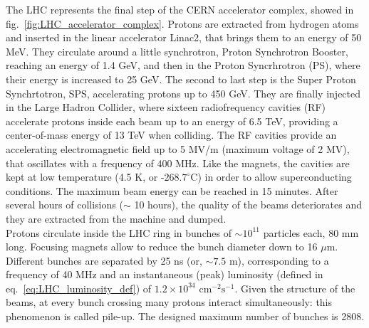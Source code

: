 \noindent The LHC represents the final step of the CERN accelerator complex, showed in fig.~\ref{fig:LHC_accelerator_complex}. Protons are extracted from hydrogen atoms and inserted in the linear accelerator Linac2, that brings them to an energy of 50 MeV. They circulate around a little synchrotron, Proton Synchrotron Booster, reaching an energy of 1.4 GeV, and then in the Proton Syncrhrotron (PS), where their energy is increased to 25 GeV. The second to last step is the Super Proton Synchrtotron, SPS, accelerating protons up to 450 GeV. They are finally injected in the Large Hadron Collider, where sixteen radiofrequency cavities (RF) accelerate protons inside each beam up to an energy of 6.5 TeV, providing a center-of-mass energy of 13 TeV when colliding. The RF cavities provide an accelerating electromagnetic field up to 5 MV/m (maximum voltage of 2 MV), that oscillates with a frequency of 400 MHz. Like the magnets, the cavities are kept at low temperature (4.5 K, or -$268.7^{\circ}$C) in order to allow superconducting conditions. The maximum beam energy can be reached in 15 minutes. After several hours of collisions ($\sim$ 10 hours), the quality of the beams deteriorates and they are extracted from the machine and dumped.\\

\noindent Protons circulate inside the LHC ring in bunches of $\sim10^{11}$ particles each, 80 mm long. Focusing magnets allow to reduce the bunch diameter down to 16 $\mu$m. Different bunches are separated by 25 ns (or, $\sim 7.5$ m), corresponding to a frequency of 40 MHz and an instantaneous (peak) luminosity (defined in eq.~\ref{eq:LHC_luminosity_def}) of $1.2 \times 10^{34}\mbox{ cm}^{-2} \mbox{s}^{-1}$. Given the structure of the beams, at every bunch crossing many protons interact simultaneously: this phenomenon is called pile-up. The designed maximum number of bunches is 2808.\\

